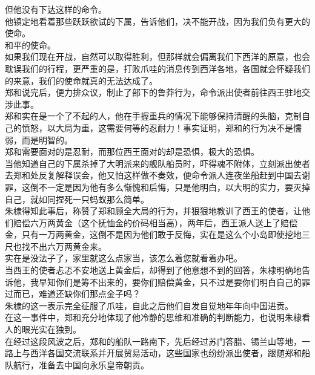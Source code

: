 \begin{multicols}{\theparacolNo}
但他没有下达这样的命令。\\

他镇定地看着那些跃跃欲试的下属，告诉他们，决不能开战，因为我们负有更大的使命。\\

和平的使命。\\

如果我们现在开战，自然可以取得胜利，但那样就会偏离我们下西洋的原意，也会耽误我们的行程，更严重的是，打败爪哇的消息传到西洋各地，各国就会怀疑我们的来意，我们的使命就真的无法达成了。\\

郑和说完后，便力排众议，制止了部下的鲁莽行为，命令派出使者前往西王驻地交涉此事。\\

郑和实在是一个了不起的人，他在手握重兵的情况下能够保持清醒的头脑，克制自己的愤怒，以大局为重，这需要何等的忍耐力！事实证明，郑和的行为决不是懦弱，而是明智的。\\

郑和需要面对的是忍耐，而那位西王面对的却是恐惧，极大的恐惧。\\

当他知道自己的下属杀掉了大明派来的舰队船员时，吓得魂不附体，立刻派出使者去郑和处反复解释误会，他又怕这样做不奏效，便命令派人连夜坐船赶到中国去谢罪，这倒不一定是因为他有多么惭愧和后悔，只是他明白，以大明的实力，要灭掉自己，就如同捏死一只蚂蚁那么简单。\\

朱棣得知此事后，称赞了郑和顾全大局的行为，并狠狠地教训了西王的使者，让他们赔偿六万两黄金（这个抚恤金的价码相当高），两年后，西王派人送上了赔偿金，只有一万两黄金，这倒不是因为他们敢于反悔，实在是这么个小岛即使挖地三尺也找不出六万两黄金来。\\

实在是没法子了，家里就这么点家当，该怎么着您就看着办吧。\\

当西王的使者忐忑不安地送上黄金后，却得到了他意想不到的回答，朱棣明确地告诉他，我早知你们是筹不出来的，要你们赔偿黄金，只不过是要你们明白自己的罪过而已，难道还缺你们那点金子吗？\\

朱棣的这一表示完全征服了爪哇，自此之后他们自发自觉地年年向中国进贡。\\

在这一事件中，郑和充分地体现了他冷静的思维和准确的判断能力，也说明朱棣看人的眼光实在独到。\\

在经过这段风波之后，郑和的船队一路南下，先后经过苏门答腊、锡兰山等地，一路上与西洋各国交流联系并开展贸易活动，这些国家也纷纷派出使者，跟随郑和船队航行，准备去中国向永乐皇帝朝贡。\\


\end{multicols}
